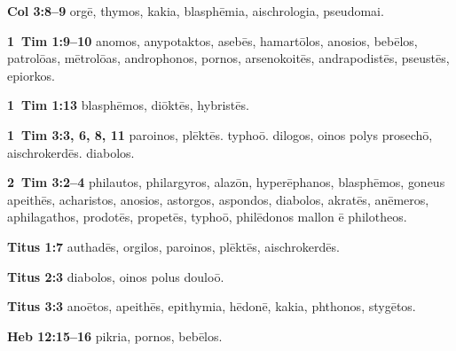 \textbf{Col 3:8--9} \gls{orgē}, \gls{thymos}, \gls{kakia}, \gls{blasphēmia}, \gls{aischrologia}, %
\gls{pseudomai}. %

\textbf{1~Tim 1:9--10} \gls{anomos}, \gls{anypotaktos}, \gls{asebēs}, \gls{hamartōlos}, \gls{anosios}, \gls{bebēlos}, \gls{patrolōas}, \gls{mētrolōas}, \gls{androphonos}, %
\gls{pornos}, \gls{arsenokoitēs}, \gls{andrapodistēs}, \gls{pseustēs}, \gls{epiorkos}. %

\textbf{1~Tim 1:13} \gls{blasphēmos}, \gls{diōktēs}, \gls{hybristēs}.

\textbf{1~Tim 3:3, 6, 8, 11} \gls{paroinos}, \gls{plēktēs}. %
\gls{typhoō}. %
\gls{dilogos}, \gls{oinos polys prosechō}, \gls{aischrokerdēs}. %
\gls{diabolos}. %


\textbf{2~Tim 3:2--4} \gls{philautos}, \gls{philargyros}, \gls{alazōn}, \gls{hyperēphanos}, \gls{blasphēmos}, \gls{goneus apeithēs}, \gls{acharistos}, \gls{anosios}, %
\gls{astorgos}, \gls{aspondos}, \gls{diabolos}, \gls{akratēs}, \gls{anēmeros}, \gls{aphilagathos}, %
\gls{prodotēs}, \gls{propetēs}, \gls{typhoō}, \gls{philēdonos mallon ē philotheos}. %

\textbf{Titus 1:7} \gls{authadēs}, \gls{orgilos}, \gls{paroinos}, \gls{plēktēs}, \gls{aischrokerdēs}.

\textbf{Titus 2:3} \gls{diabolos}, \gls{oinos polus douloō}.

\textbf{Titus 3:3} \gls{anoētos}, \gls{apeithēs}, \gls{epithymia}, \gls{hēdonē}, \gls{kakia}, \gls{phthonos}, \gls{stygētos}.


\textbf{Heb 12:15--16} \gls{pikria}, %
\gls{pornos}, \gls{bebēlos}. %

